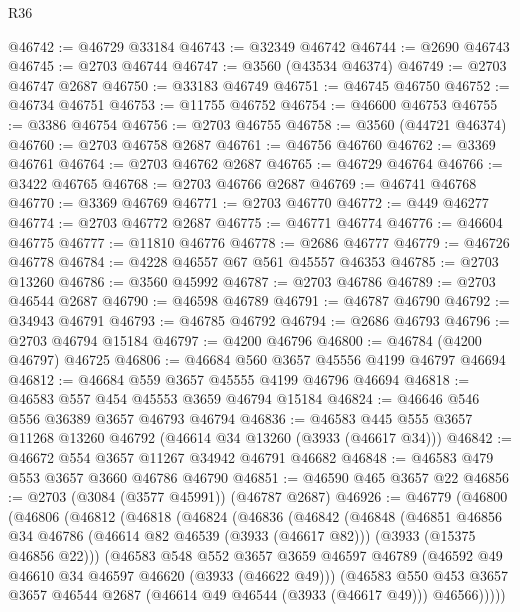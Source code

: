 \begin{lexlean}{R36}
\begin{coremodule}
@46742 := @46729 @33184
@46743 := @32349 @46742
@46744 := @2690 @46743
@46745 := @2703 @46744
@46747 := @3560 (@43534 @46374)
@46749 := @2703 @46747 @2687
@46750 := @33183 @46749
@46751 := @46745 @46750
@46752 := @46734 @46751
@46753 := @11755 @46752
@46754 := @46600 @46753
@46755 := @3386 @46754
@46756 := @2703 @46755
@46758 := @3560 (@44721 @46374)
@46760 := @2703 @46758 @2687
@46761 := @46756 @46760
@46762 := @3369 @46761
@46764 := @2703 @46762 @2687
@46765 := @46729 @46764
@46766 := @3422 @46765
@46768 := @2703 @46766 @2687
@46769 := @46741 @46768
@46770 := @3369 @46769
@46771 := @2703 @46770
@46772 := @449 @46277
@46774 := @2703 @46772 @2687
@46775 := @46771 @46774
@46776 := @46604 @46775
@46777 := @11810 @46776
@46778 := @2686 @46777
@46779 := @46726 @46778
@46784 := @4228 @46557 @67 @561 @45557 @46353
@46785 := @2703 @13260
@46786 := @3560 @45992
@46787 := @2703 @46786
@46789 := @2703 @46544 @2687
@46790 := @46598 @46789
@46791 := @46787 @46790
@46792 := @34943 @46791
@46793 := @46785 @46792
@46794 := @2686 @46793
@46796 := @2703 @46794 @15184
@46797 := @4200 @46796
@46800 := @46784 (@4200 @46797) @46725
@46806 := @46684 @560 @3657 @45556 @4199 @46797 @46694
@46812 := @46684 @559 @3657 @45555 @4199 @46796 @46694
@46818 := @46583 @557 @454 @45553 @3659 @46794 @15184
@46824 := @46646 @546 @556 @36389 @3657 @46793 @46794
@46836 := @46583 @445 @555 @3657 @11268 @13260 @46792 (@46614 @34 @13260 (@3933 (@46617 @34)))
@46842 := @46672 @554 @3657 @11267 @34942 @46791 @46682
@46848 := @46583 @479 @553 @3657 @3660 @46786 @46790
@46851 := @46590 @465 @3657 @22
@46856 := @2703 (@3084 (@3577 @45991)) (@46787 @2687)
@46926 := @46779
    (@46800
      (@46806
        (@46812
          (@46818
            (@46824
              (@46836
                (@46842
                  (@46848
                    (@46851
                      @46856
                      @34
                      @46786
                      (@46614 @82 @46539 (@3933 (@46617 @82)))
                      (@3933 (@15375 @46856 @22)))
                    (@46583
                      @548
                      @552
                      @3657
                      @3659
                      @46597
                      @46789
                      (@46592 @49 @46610 @34 @46597 @46620 (@3933 (@46622 @49)))
                      (@46583
                        @550
                        @453
                        @3657
                        @3657
                        @46544
                        @2687
                        (@46614 @49 @46544 (@3933 (@46617 @49)))
                        @46566)))))

\end{coremodule}
\end{lexlean}
